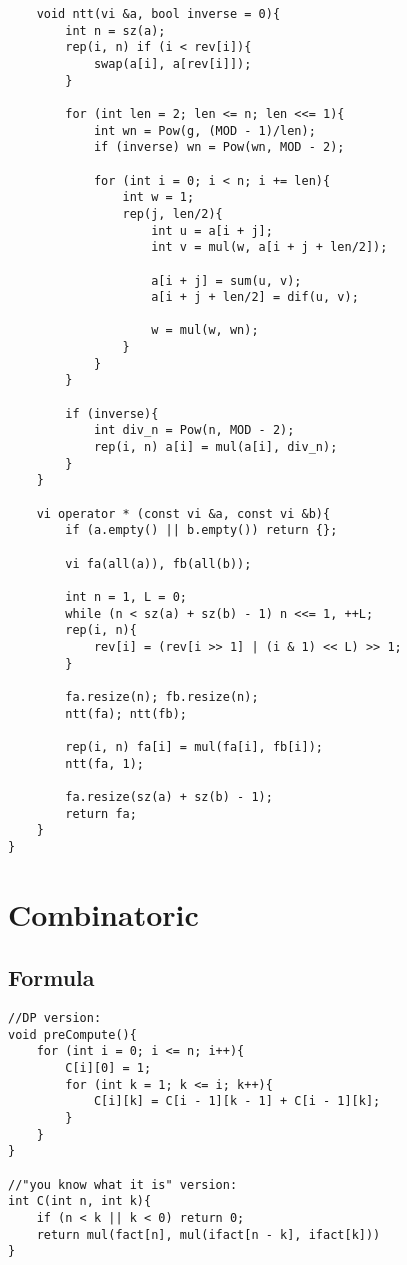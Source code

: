 \documentclass[11pt,a4paper]{article}
\begin{document}
\begin{multicols*}{2}
\begin{lstlisting}
    void ntt(vi &a, bool inverse = 0){
        int n = sz(a);
        rep(i, n) if (i < rev[i]){
            swap(a[i], a[rev[i]]);
        }

        for (int len = 2; len <= n; len <<= 1){
            int wn = Pow(g, (MOD - 1)/len);
            if (inverse) wn = Pow(wn, MOD - 2);
            
            for (int i = 0; i < n; i += len){
                int w = 1;
                rep(j, len/2){
                    int u = a[i + j];
                    int v = mul(w, a[i + j + len/2]);

                    a[i + j] = sum(u, v);
                    a[i + j + len/2] = dif(u, v);

                    w = mul(w, wn);
                }
            }
        }

        if (inverse){
            int div_n = Pow(n, MOD - 2);
            rep(i, n) a[i] = mul(a[i], div_n);
        }
    }

    vi operator * (const vi &a, const vi &b){
        if (a.empty() || b.empty()) return {};

        vi fa(all(a)), fb(all(b));

        int n = 1, L = 0;
        while (n < sz(a) + sz(b) - 1) n <<= 1, ++L;
        rep(i, n){
            rev[i] = (rev[i >> 1] | (i & 1) << L) >> 1;
        }

        fa.resize(n); fb.resize(n);
        ntt(fa); ntt(fb);

        rep(i, n) fa[i] = mul(fa[i], fb[i]);
        ntt(fa, 1);

        fa.resize(sz(a) + sz(b) - 1);
        return fa;
    }
}
\end{lstlisting}

\section{Combinatoric}
\subsection{Formula}
\begin{lstlisting}
//DP version:
void preCompute(){
    for (int i = 0; i <= n; i++){
        C[i][0] = 1;
        for (int k = 1; k <= i; k++){
            C[i][k] = C[i - 1][k - 1] + C[i - 1][k];
        }
    }
}

//"you know what it is" version:
int C(int n, int k){
    if (n < k || k < 0) return 0;
    return mul(fact[n], mul(ifact[n - k], ifact[k])) 
}
\end{lstlisting}


\end{multicols*}
\end{document}
